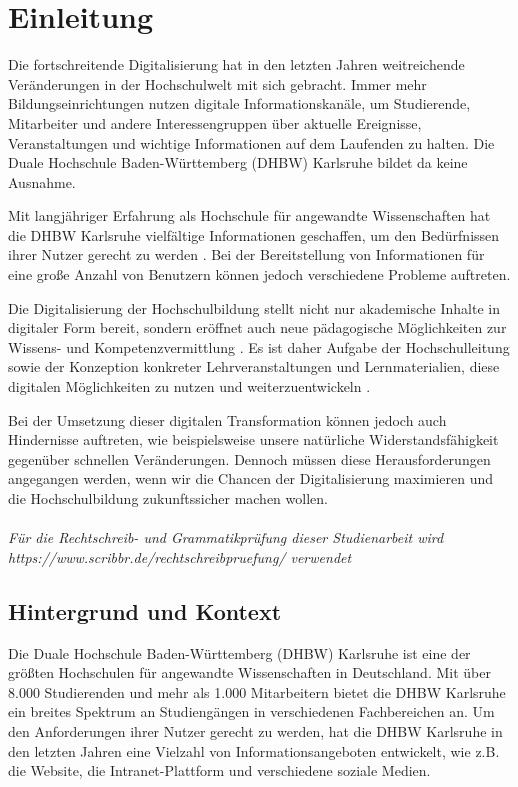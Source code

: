 \chapter{Einleitung}
Die fortschreitende Digitalisierung hat in den letzten Jahren weitreichende Veränderungen in der Hochschulwelt mit sich gebracht. Immer mehr Bildungseinrichtungen nutzen digitale Informationskanäle, um Studierende, Mitarbeiter und andere Interessengruppen über aktuelle Ereignisse, Veranstaltungen und wichtige Informationen auf dem Laufenden zu halten\cite{aachenerzeitung2022}. Die Duale Hochschule Baden-Württemberg (DHBW) Karlsruhe bildet da keine Ausnahme.

Mit langjähriger Erfahrung als Hochschule für angewandte Wissenschaften hat die DHBW Karlsruhe vielfältige Informationen geschaffen, um den Bedürfnissen ihrer Nutzer gerecht zu werden \cite{degruyter2021}. Bei der Bereitstellung von Informationen für eine große Anzahl von Benutzern können jedoch verschiedene Probleme auftreten.

Die Digitalisierung der Hochschulbildung stellt nicht nur akademische Inhalte in digitaler Form bereit, sondern eröffnet auch neue pädagogische Möglichkeiten zur Wissens- und Kompetenzvermittlung \cite{hochschulforumdigitalisierung}. Es ist daher Aufgabe der Hochschulleitung sowie der Konzeption konkreter Lehrveranstaltungen und Lernmaterialien, diese digitalen Möglichkeiten zu nutzen und weiterzuentwickeln \cite{springerlink2023}. 

Bei der Umsetzung dieser digitalen Transformation können jedoch auch Hindernisse auftreten, wie beispielsweise unsere natürliche Widerstandsfähigkeit gegenüber schnellen Veränderungen\cite{degruyter2021_2}. Dennoch müssen diese Herausforderungen angegangen werden, wenn wir die Chancen der Digitalisierung maximieren und die Hochschulbildung zukunftssicher machen wollen.
\\\\
\emph{Für die Rechtschreib- und Grammatikprüfung dieser Studienarbeit wird\\ https://www.scribbr.de/rechtschreibpruefung/ verwendet} 

\section{Hintergrund und Kontext}
Die Duale Hochschule Baden-Württemberg (DHBW) Karlsruhe ist eine der größten Hochschulen für angewandte Wissenschaften in Deutschland. Mit über 8.000 Studierenden und mehr als 1.000 Mitarbeitern bietet die DHBW Karlsruhe ein breites Spektrum an Studiengängen in verschiedenen Fachbereichen an. Um den Anforderungen ihrer Nutzer gerecht zu werden, hat die DHBW Karlsruhe in den letzten Jahren eine Vielzahl von Informationsangeboten entwickelt, wie z.B. die Website, die Intranet-Plattform und verschiedene soziale Medien.

